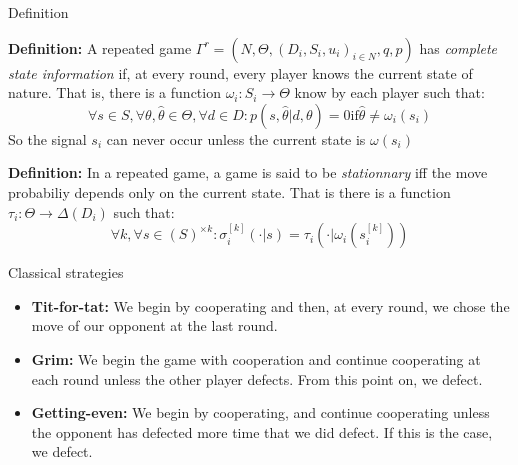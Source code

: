 \begin{frame}{Definition}

\textbf{Definition: }A repeated game $\Gamma^r = (N,\Theta, (D_i,S_i,u_i)_{i\in N},q,p)$ has \textit{complete state information} if, at every round, every player knows the current state of nature. That is, there is a function $\omega_i:S_i \rightarrow \Theta$ know by each player such that:
\begin{equation*}
	\forall s \in S, \forall \theta, \hat{\theta} \in \Theta, \forall d \in D : p(s,\hat{\theta} | d,\theta) = 0 \text{if} \hat{\theta} \neq \omega_i(s_i)
\end{equation*}
So the signal $s_i$ can never occur unless the current state is $\omega(s_i)$

\pause

\textbf{Definition: }In a repeated game, a game is said to be \textit{stationnary} iff the move probabiliy depends only on the current state. That is there is a function $\tau_i : \Theta \rightarrow \Delta(D_i)$ such that:
\begin{equation*}
	\forall k, \forall s \in (S)^{\times k} : \sigma_i^{[k]}(\cdot | s) = \tau_i(\cdot | \omega_i(s_i^{[k]}))
\end{equation*}
\end{frame}

\begin{frame}{Classical strategies}
\begin{itemize}
	\item \textbf{Tit-for-tat:} We begin by cooperating and then, at every round, we chose the move of our opponent at the last round.
	\item \textbf{Grim:} We begin the game with cooperation and continue cooperating at each round unless the other player defects. From this point on, we defect.
	\item \textbf{Getting-even:} We begin by cooperating, and continue cooperating unless the opponent has defected more time that we did defect. If this is the case, we defect.
\end{itemize}
\end{frame}

